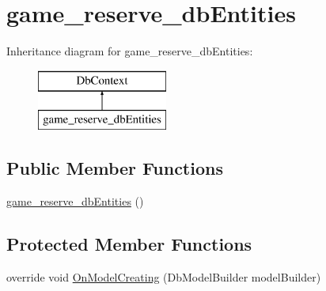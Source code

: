 \hypertarget{classWildLifeTracker_1_1game__reserve__dbEntities}{}\section{game\+\_\+reserve\+\_\+db\+Entities}
\label{classWildLifeTracker_1_1game__reserve__dbEntities}
Inheritance diagram for game\+\_\+reserve\+\_\+db\+Entities\+:\begin{figure}[H]
\begin{center}
\leavevmode
\includegraphics[height=2.000000cm]{classWildLifeTracker_1_1game__reserve__dbEntities}
\end{center}
\end{figure}
\subsection*{Public Member Functions}
\begin{DoxyCompactItemize}
\item 
\hyperlink{classWildLifeTracker_1_1game__reserve__dbEntities_a6075f6593be0d53a6314ed33bbe75cdf}{game\+\_\+reserve\+\_\+db\+Entities} ()
\end{DoxyCompactItemize}
\subsection*{Protected Member Functions}
\begin{DoxyCompactItemize}
\item 
override void \hyperlink{classWildLifeTracker_1_1game__reserve__dbEntities_a9161eb4f8fe83c74aab42d8fcde1fb10}{On\+Model\+Creating} (Db\+Model\+Builder model\+Builder)
\end{DoxyCompactItemize}

